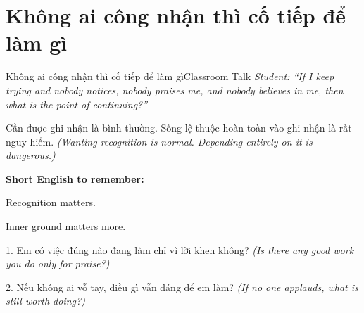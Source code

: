 \section{Không ai công nhận thì cố tiếp để làm gì}
\begin{truyen}{Không ai công nhận thì cố tiếp để làm gì}{Classroom Talk}
\textit{Student: ``If I keep trying and nobody notices, nobody praises me, and nobody believes in me, then what is the point of continuing?''}\\[4pt]



\end{truyen}

\begin{baihoc}
Cần được ghi nhận là bình thường. Sống lệ thuộc hoàn toàn vào ghi nhận là rất nguy hiểm.
\textit{(Wanting recognition is normal. Depending entirely on it is dangerous.)}
\end{baihoc}

\begin{ghinhoanh}
\textbf{Short English to remember:}

Recognition matters.

Inner ground matters more.
\end{ghinhoanh}

\begin{tuhocnhanh}
1. Em có việc đúng nào đang làm chỉ vì lời khen không? \textit{(Is there any good work you do only for praise?)}

2. Nếu không ai vỗ tay, điều gì vẫn đáng để em làm? \textit{(If no one applauds, what is still worth doing?)}
\end{tuhocnhanh}
\ngancach


